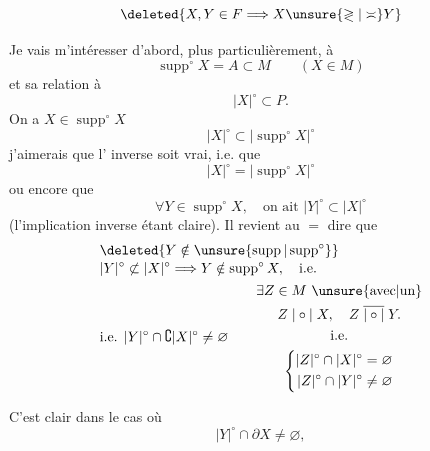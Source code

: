 

\[
\deleted{X,Y\in F\Longrightarrow X\unsure{\gtrless|\asymp}Y}
\]

Je vais m'intéresser d'abord, plus particulièrement, à
\[
\operatorname{supp}^{\circ}X=A\subset M\qquad(X\in M)
\]
et sa relation à
\[
|X|^{\circ}\subset P.
\]
On a $X\in\operatorname{supp}^{\circ}X$ 
\[
|X|^{\circ}\subset|\operatorname{supp}^{\circ}X|^{\circ}
\]
j'aimerais que l' inverse soit vrai, i.e. que
\[
|X|^{\circ}=|\operatorname{supp}^{\circ}X|^{\circ}
\]
ou encore que
\[
\forall Y\in\operatorname{supp}^{\circ}X,\quad\text{on ait }|Y|^{\circ}\subset|X|^{\circ}
\]
(l'implication inverse étant claire).
Il revient au $=$ dire que
\[
\begin{aligned}
&\deleted{Y\notin\unsure{\operatorname{supp}|\operatorname{supp}^{\circ}}}\\[-2pt]
&|Y|^{\circ}\not\subset|X|^{\circ}\Longrightarrow Y\notin\operatorname{supp}^{\circ}X,\quad\text{i.e.}\\
&\text{i.e. }|Y|^{\circ}\cap\complement|X|^{\circ}\neq\varnothing
\qquad\begin{gathered}
\exists Z\in M\ \unsure{\text{avec}|\text{un}}\\
Z\mathrel{|\circ|}X,\quad Z\mathrel{\overline{|\circ|}}Y.\\
\text{i.e.}\\
\left\{\begin{aligned}
|Z|^{\circ}\cap|X|^{\circ}&=\varnothing\\
|Z|^{\circ}\cap|Y|^{\circ}&\neq\varnothing
\end{aligned}\right.
\end{gathered}
\end{aligned}
\]
\clearpage
{}

C'est clair dans le cas où
\[
|Y|^{\circ}\cap\partial X\neq\varnothing,
\]

